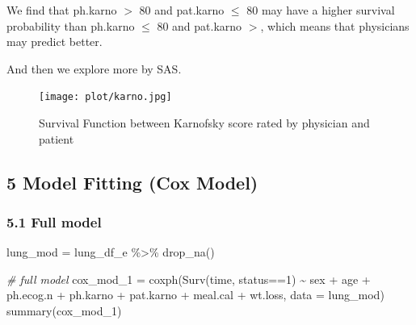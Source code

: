 \documentclass[
]{article}
\newenvironment{Shaded}{\begin{snugshade}}{\end{snugshade}}
\newcommand{\AttributeTok}[1]{\textcolor[rgb]{0.77,0.63,0.00}{#1}}
\newcommand{\CommentTok}[1]{\textcolor[rgb]{0.56,0.35,0.01}{\textit{#1}}}
\newcommand{\DecValTok}[1]{\textcolor[rgb]{0.00,0.00,0.81}{#1}}
\newcommand{\FunctionTok}[1]{\textcolor[rgb]{0.00,0.00,0.00}{#1}}
\newcommand{\NormalTok}[1]{#1}
\newcommand{\OtherTok}[1]{\textcolor[rgb]{0.56,0.35,0.01}{#1}}
\newcommand{\SpecialCharTok}[1]{\textcolor[rgb]{0.00,0.00,0.00}{#1}}
\begin{document}
We find that ph.karno \(>\) 80 and pat.karno \(\le\) 80 may have a
higher survival probability than ph.karno \(\le\) 80 and pat.karno
\(>\), which means that physicians may predict better.

And then we explore more by SAS.

\begin{figure}
\centering
\texttt{[image: plot/karno.jpg]}
\caption{Survival Function between Karnofsky score rated by physician
and patient}
\end{figure}

\hypertarget{model-fitting-cox-model}{%
\subsection{5 Model Fitting (Cox Model)}\label{model-fitting-cox-model}}

\hypertarget{full-model}{%
\subsubsection{5.1 Full model}\label{full-model}}

\begin{Shaded}
\begin{Highlighting}[]
\NormalTok{lung\_mod }\OtherTok{=}\NormalTok{ lung\_df\_e }\SpecialCharTok{\%\textgreater{}\%}
  \FunctionTok{drop\_na}\NormalTok{()}

\CommentTok{\# full model}
\NormalTok{cox\_mod\_1 }\OtherTok{=} \FunctionTok{coxph}\NormalTok{(}\FunctionTok{Surv}\NormalTok{(time, status}\SpecialCharTok{==}\DecValTok{1}\NormalTok{) }\SpecialCharTok{\textasciitilde{}}\NormalTok{ sex }\SpecialCharTok{+}\NormalTok{ age }\SpecialCharTok{+}\NormalTok{ ph.ecog.n }\SpecialCharTok{+}\NormalTok{ ph.karno }\SpecialCharTok{+}\NormalTok{ pat.karno }\SpecialCharTok{+}\NormalTok{ meal.cal }\SpecialCharTok{+}\NormalTok{ wt.loss, }\AttributeTok{data =}\NormalTok{ lung\_mod)}
\FunctionTok{summary}\NormalTok{(cox\_mod\_1)}
\end{Highlighting}
\end{Shaded}
\end{document}

